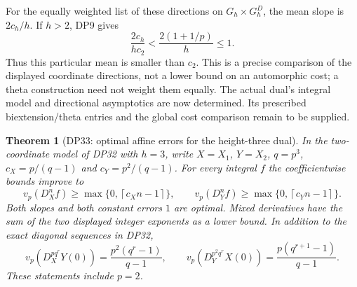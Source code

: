 \documentclass[11pt,a4paper]{article}
\newtheorem{theorem}{Theorem}[section]
\theoremstyle{definition}\newtheorem{remark}[theorem]{Remark}
\newcommand{\ceil}[1]{\left\lceil #1\right\rceil}\newcommand{\floor}[1]{\left\lfloor #1\right\rfloor}
\begin{document}
For the equally weighted list of these directions on $G_h\times G_h^D$, the mean slope is $2c_h/h$. If $h>2$, DP9 gives
\[
 \frac{2c_h}{hc_2}<\frac{2(1+1/p)}h\le1.
\]
Thus this particular mean is smaller than $c_2$. This is a precise comparison of the displayed coordinate directions, not a lower bound on an automorphic cost; a theta construction need not weight them equally. The actual dual's integral model and directional asymptotics are now determined. Its prescribed biextension/theta entries and the global cost comparison remain to be supplied.

\begin{theorem}[DP33: optimal affine errors for the height-three dual]\label{DP33}
In the two-coordinate model of DP32 with $h=3$, write $X=X_1$, $Y=X_2$, $q=p^3$, $c_X=p/(q-1)$ and $c_Y=p^2/(q-1)$. For every integral $f$ the coefficientwise bounds improve to
\[
 v_p(D_X^nf)\ge\max\{0,\ceil{c_Xn-1}\},\qquad
 v_p(D_Y^nf)\ge\max\{0,\ceil{c_Yn-1}\}.
\]
Both slopes and both constant errors $1$ are optimal. Mixed derivatives have the sum of the two displayed integer exponents as a lower bound. In addition to the exact diagonal sequences in DP32,
\[
 v_p(D_X^{pq^r}Y(0))=\frac{p^2(q^r-1)}{q-1},\qquad
 v_p(D_Y^{p^2q^r}X(0))=\frac{p(q^{r+1}-1)}{q-1}.
\]
These statements include $p=2$.
\end{theorem}
\end{document}
